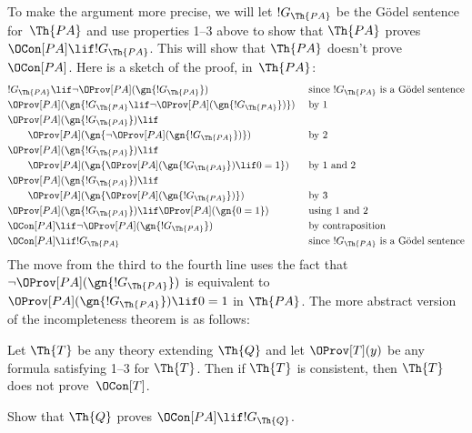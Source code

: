\documentclass[../../include/open-logic-section]{subfiles}
\begin{document}
To make the argument more precise, we will let $!G_\Th{PA}$ be the
G\"odel sentence for~$\Th{PA}$ and use properties 1--3 above to show
that $\Th{PA}$ proves $\OCon[PA] \lif !G_\Th{PA}$. This will show that
$\Th{PA}$ doesn't prove $\OCon[PA]$. Here is a sketch of the proof,
in~$\Th{PA}$:
\begin{align*}
& !G_\Th{PA} \lif \lnot \OProv[PA](\gn{!G_\Th{PA}}) &\ & 
  \text{since $!G_\Th{PA}$ is a G\"odel  sentence} \\
& \OProv[PA](\gn{!G_\Th{PA} \lif \lnot \OProv[PA](\gn{!G_\Th{PA}})}) && 
   \text{by 1} \\
& \OProv[PA](\gn{!G_\Th{PA}}) \lif \\
& \qquad \OProv[PA](\gn{\lnot \OProv[PA](\gn{!G_\Th{PA}})}) &&
   \text{by 2} \\
& \OProv[PA](\gn{!G_\Th{PA}}) \lif \\
& \qquad \OProv[PA](\gn{\OProv[PA](\gn{!G_\Th{PA}}) \lif 0 = 1}) &&
   \text{by 1 and 2} \\
& \OProv[PA](\gn{!G_\Th{PA}}) \lif \\
& \qquad \OProv[PA](\gn{\OProv[PA](\gn{!G_\Th{PA}})}) &&
   \text{by 3} \\
& \OProv[PA](\gn{!G_\Th{PA}}) \lif \OProv[PA](\gn{0=1}) &&
   \text{using 1 and 2} \\
& \OCon[PA] \lif \lnot \OProv[PA](\gn{!G_\Th{PA}}) &&
   \text{by contraposition} \\
& \OCon[PA] \lif !G_\Th{PA} &&
   \text{since $!G_\Th{PA}$ is a G\"odel sentence}
\end{align*}
The move from the third to the fourth line uses the fact that $\lnot
\OProv[PA](\gn{!G_\Th{PA}})$ is equivalent to
$\OProv[PA](\gn{!G_\Th{PA}}) \lif 0 = 1$ in $\Th{PA}$. The more
abstract version of the incompleteness theorem is as follows:

\begin{thm}
  Let $\Th{T}$ be any theory extending $\Th{Q}$ and let
  $\OProv[T](y)$ be any formula satisfying 1--3 for $\Th{T}$. Then
  if $\Th{T}$ is consistent, then $\Th{T}$ does not prove~$\OCon[T]$.
\end{thm}

\begin{prob}
Show that $\Th{Q}$ proves $\OCon[PA] \lif !G_{\Th{Q}}$.
\end{prob}
\end{document}
